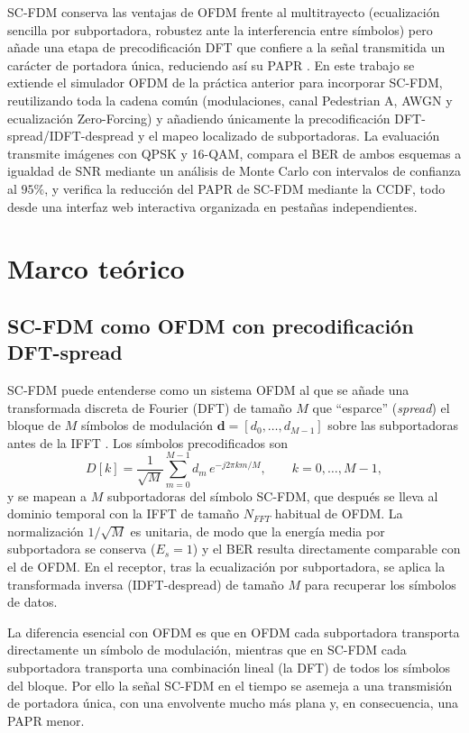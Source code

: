 \documentclass[conference,onecolumn]{IEEEtran}
\begin{document}
SC-FDM conserva las ventajas de OFDM frente al multitrayecto (ecualizaci\'on sencilla por subportadora, robustez ante la interferencia entre s\'imbolos) pero a\~nade una etapa de precodificaci\'on DFT que confiere a la se\~nal transmitida un car\'acter de portadora \'unica, reduciendo as\'i su PAPR \cite{myung2008scfdma}. En este trabajo se extiende el simulador OFDM de la pr\'actica anterior para incorporar SC-FDM, reutilizando toda la cadena com\'un (modulaciones, canal Pedestrian A, AWGN y ecualizaci\'on Zero-Forcing) y a\~nadiendo \'unicamente la precodificaci\'on DFT-spread/IDFT-despread y el mapeo localizado de subportadoras. La evaluaci\'on transmite im\'agenes con QPSK y 16-QAM, compara el BER de ambos esquemas a igualdad de SNR mediante un an\'alisis de Monte Carlo con intervalos de confianza al $95\%$, y verifica la reducci\'on del PAPR de SC-FDM mediante la CCDF, todo desde una interfaz web interactiva organizada en pesta\~nas independientes.

\section{Marco te\'orico}

\subsection{SC-FDM como OFDM con precodificaci\'on DFT-spread}

SC-FDM puede entenderse como un sistema OFDM al que se a\~nade una transformada discreta de Fourier (DFT) de tama\~no $M$ que ``esparce'' (\textit{spread}) el bloque de $M$ s\'imbolos de modulaci\'on $\mathbf{d}=[d_0,\dots,d_{M-1}]$ sobre las subportadoras antes de la IFFT \cite{myung2006scfdma,cho2010mimo}. Los s\'imbolos precodificados son
\begin{equation}
D[k]=\frac{1}{\sqrt{M}}\sum_{m=0}^{M-1} d_m\, e^{-j 2\pi k m / M}, \qquad k=0,\dots,M-1, \label{eq:dftspread}
\end{equation}
y se mapean a $M$ subportadoras del s\'imbolo SC-FDM, que despu\'es se lleva al dominio temporal con la IFFT de tama\~no $N_{FFT}$ habitual de OFDM. La normalizaci\'on $1/\sqrt{M}$ es unitaria, de modo que la energ\'ia media por subportadora se conserva ($E_s=1$) y el BER resulta directamente comparable con el de OFDM. En el receptor, tras la ecualizaci\'on por subportadora, se aplica la transformada inversa (IDFT-despread) de tama\~no $M$ para recuperar los s\'imbolos de datos.

La diferencia esencial con OFDM es que en OFDM cada subportadora transporta directamente un s\'imbolo de modulaci\'on, mientras que en SC-FDM cada subportadora transporta una combinaci\'on lineal (la DFT) de todos los s\'imbolos del bloque. Por ello la se\~nal SC-FDM en el tiempo se asemeja a una transmisi\'on de portadora \'unica, con una envolvente mucho m\'as plana y, en consecuencia, una PAPR menor.
\end{document}
